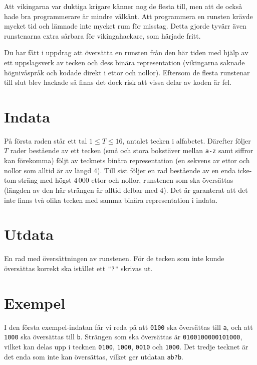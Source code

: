 Att vikingarna var duktiga krigare känner nog de flesta till, men att de också hade bra programmerare är mindre välkänt. Att programmera en runsten krävde mycket tid och lämnade inte mycket rum för misstag. Detta gjorde tyvärr även runstenarna extra sårbara för vikingahackare, som härjade fritt.

Du har fått i uppdrag att översätta en runsten från den här tiden med hjälp av ett uppslagsverk av tecken och dess binära representation (vikingarna saknade högnivåspråk och kodade direkt i ettor och nollor). Eftersom de flesta runstenar till slut blev hackade så finns det dock risk att vissa delar av koden är fel.

\section*{Indata}
På första raden står ett tal $1 \le T \le 16$, antalet tecken i alfabetet. Därefter följer $T$ rader bestående av ett tecken (små och stora bokstäver mellan \texttt{a-z} samt siffror kan förekomma) följt av tecknets binära representation (en sekvens av ettor och nollor som alltid är av längd 4). Till sist följer en rad bestående av en enda icke-tom sträng med högst $4\,000$ ettor och nollor, runstenen som ska översättas (längden av den här strängen är alltid delbar med 4). Det är garanterat att det inte finns två olika tecken med samma binära representation i indata.

\section*{Utdata}
En rad med översättningen av runstenen. För de tecken som inte kunde översättas korrekt ska istället ett \texttt{"?"} skrivas ut.

\section*{Exempel}
I den första exempel-indatan får vi reda på att \texttt{0100} ska översättas till \texttt{a}, och att \texttt{1000} ska översättas till \texttt{b}. Strängen som ska översättas är \texttt{0100100000101000}, vilket kan delas upp i tecknen \texttt{0100}, \texttt{1000}, \texttt{0010} och \texttt{1000}. Det tredje tecknet är det enda som inte kan översättas, vilket ger utdatan \texttt{ab?b}.
